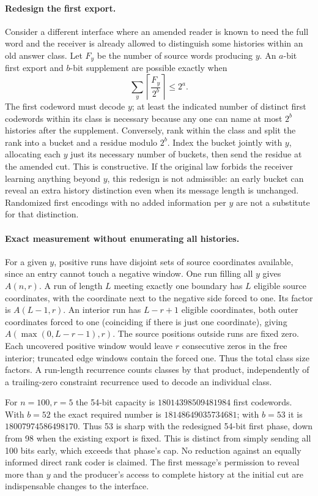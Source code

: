 \documentclass{article}
\begin{document}
\paragraph{Redesign the first export.}
Consider a different interface where an amended reader is known to need
the full word and the receiver is already allowed to distinguish some
histories within an old answer class. Let $F_y$ be the number of source
words producing $y$. An $a$-bit first export and $b$-bit supplement are
possible exactly when
\[
 \sum_y\left\lceil\frac{F_y}{2^b}\right\rceil\le 2^a.
\]
The first codeword must decode $y$; at least the indicated number of
distinct first codewords within its class is necessary because any one
can name at most $2^b$ histories after the supplement. Conversely,
rank within the class and split the rank into a bucket and a residue
modulo $2^b$. Index the bucket jointly with $y$, allocating each $y$
just its necessary number of buckets, then send the residue at the
amended cut. This is constructive. If the original law forbids the
receiver learning anything beyond $y$, this redesign is not admissible:
an early bucket can reveal an extra history distinction even when its
message length is unchanged. Randomized first encodings with no added
information per $y$ are not a substitute for that distinction.

\paragraph{Exact measurement without enumerating all histories.}
For a given $y$, positive runs have disjoint sets of source coordinates
available, since an entry cannot touch a negative window. One run filling
all $y$ gives $A(n,r)$. A run of length $L$ meeting exactly one boundary
has $L$ eligible source coordinates, with the coordinate next to the
negative side forced to one. Its factor is $A(L-1,r)$. An interior run
has $L-r+1$ eligible coordinates, both outer coordinates forced to one
(coinciding if there is just one coordinate), giving
$A(\max(0,L-r-1),r)$. The source positions outside runs are fixed zero.
Each uncovered positive window would leave $r$ consecutive zeros in the
free interior; truncated edge windows contain the forced one. Thus the
total class size factors. A run-length recurrence counts classes by that
product, independently of a trailing-zero constraint recurrence used to
decode an individual class.

For $n=100,r=5$ the 54-bit capacity is $18014398509481984$ first
codewords. With $b=52$ the exact required number is $18148649035734681$;
with $b=53$ it is $18007974586498170$. Thus 53 is sharp with the redesigned
54-bit first phase, down from 98 when the existing export is fixed.
This is distinct from simply sending all 100 bits early, which exceeds
that phase's cap. No reduction against an equally informed direct rank
coder is claimed. The first message's permission to reveal more than
$y$ and the producer's access to complete history at the initial cut
are indispensable changes to the interface.
\end{document}
